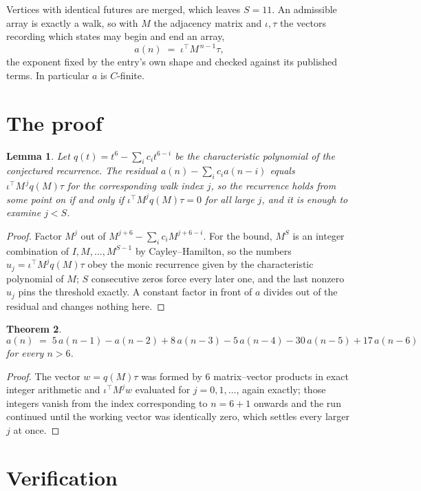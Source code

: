 \documentclass[11pt,a4paper]{article}
\theoremstyle{plain}
\newtheorem{theorem}{Theorem}
\newtheorem{lemma}[theorem]{Lemma}
\theoremstyle{definition}
\begin{document}
Vertices with identical futures are merged, which leaves $S=11$. An admissible array is exactly a walk, so with $M$ the adjacency matrix and $\iota,\tau$ the vectors recording which states may begin and end an array,
\[
a(n)\;=\;\iota^{\!\top}M^{\,n-1}\tau ,
\]
the exponent fixed by the entry's own shape and checked against its published terms. In
particular $a$ is $C$-finite.

\section{The proof}

\begin{lemma}\label{lem:crit}
Let $q(t)=t^{6}-\sum_i c_it^{6-i}$ be the characteristic polynomial of the
conjectured recurrence. The residual $a(n)-\sum_ic_ia(n-i)$ equals
$\iota^{\!\top}M^{\,j}q(M)\tau$ for the corresponding walk index $j$, so the recurrence
holds from some point on if and only if $\iota^{\!\top}M^{j}q(M)\tau=0$ for all large $j$,
and it is enough to examine $j<S$.
\end{lemma}

\begin{proof}
Factor $M^{j}$ out of $M^{j+6}-\sum_ic_iM^{j+6-i}$. For the bound, $M^{S}$
is an integer combination of $I,M,\dots,M^{S-1}$ by Cayley--Hamilton, so the numbers
$u_j=\iota^{\!\top}M^{j}q(M)\tau$ obey the monic recurrence given by the characteristic
polynomial of $M$; $S$ consecutive zeros force every later one, and the last nonzero $u_j$
pins the threshold exactly. A constant factor in front of $a$ divides out of the residual and
changes nothing here.
\end{proof}

\begin{theorem}
\[
a(n)\;=\;5\,a(n-1) - a(n-2) + 8\,a(n-3) - 5\,a(n-4) - 30\,a(n-5) + 17\,a(n-6)
\]
for every $n>6$.
\end{theorem}

\begin{proof}
The vector $w=q(M)\tau$ was formed by $6$ matrix--vector products in exact integer
arithmetic and $\iota^{\!\top}M^{j}w$ evaluated for $j=0,1,\dots$, again exactly; those
integers vanish from the index corresponding to $n=6+1$ onwards and the run continued
until the working vector was identically zero, which settles every larger $j$ at once.
\end{proof}

\section{Verification}
\end{document}
